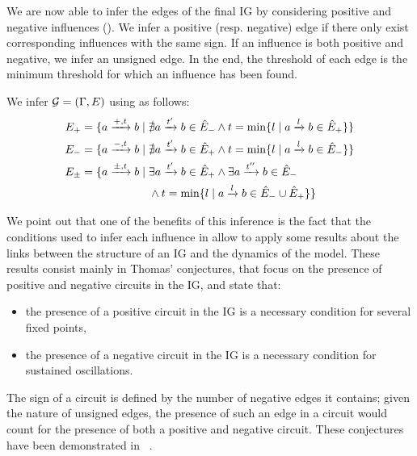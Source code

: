 We are now able to infer the edges of the final IG by considering positive and negative influences
().
We infer a positive (resp. negative) edge if there only exist corresponding influences with the same sign.
If an influence is both positive and negative, we infer an unsigned edge.
In the end, the threshold of each edge is the minimum threshold for which an influence has been found.
%
\begin{proposition}\label{pps:inference-IG}
We infer $\mathcal{G} = (\Gamma,E)$ using  as follows:
\begin{align*}
E_+ &= \{ a \xrightarrow{+, t} b \mid \nexists a \xrightarrow{t'} b \in \hat{E}_-
  \wedge t = \min \{ l \mid a \xrightarrow{l} b \in \hat{E}_+\}\} \\
E_- &= \{ a \xrightarrow{-, t} b \mid \nexists a \xrightarrow{t'} b \in \hat{E}_+
  \wedge t = \min \{l \mid a \xrightarrow{l} b \in \hat{E}_-\}\} \\
E_\pm &= \{ a \xrightarrow{\pm, t} b \mid \exists a \xrightarrow{t'} b \in \hat{E}_+ \wedge \exists a \xrightarrow{t''} b \in \hat{E}_- \\
  & \qquad\qquad\qquad \wedge t = \min \{l \mid a \xrightarrow{l} b \in \hat{E}_- \cup \hat{E}_+\}\}
\end{align*}
\end{proposition}

We point out that one of the benefits of this inference is the fact that the conditions used to infer each influence
in 
allow to apply some results about the links between the structure of an IG and the dynamics of the model.
These results consist mainly in Thomas' conjectures, that focus on the presence of positive and negative circuits in the IG, and state that:
\begin{itemize}
  \item the presence of a positive circuit in the IG is a necessary condition for several fixed points,
  \item the presence of a negative circuit in the IG is a necessary condition for sustained oscillations.
\end{itemize}
The sign of a circuit is defined by the number of negative edges it contains;
given the nature of unsigned edges, the presence of such an edge in a circuit would count for the presence of both a positive and negative circuit.
These conjectures have been demonstrated in~\cite{Richard2010378} .


